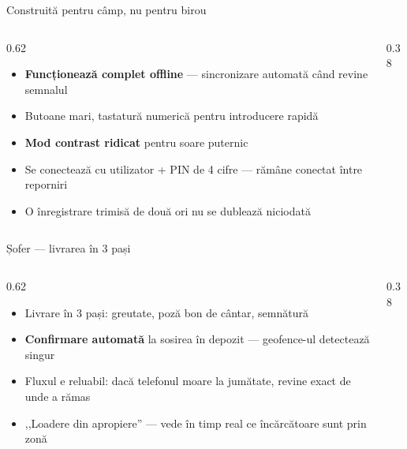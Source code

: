 \documentclass[aspectratio=169,10pt]{beamer}
\begin{document}
\begin{frame}{Construită pentru câmp, nu pentru birou}
  \begin{columns}[T]
    \begin{column}{0.62\linewidth}
      \vspace{0.3cm}
      \begin{itemize}
        \item \textbf{Funcționează complet offline} — sincronizare automată când revine semnalul
        \item Butoane mari, tastatură numerică pentru introducere rapidă
        \item \textbf{Mod contrast ridicat} pentru soare puternic
        \item Se conectează cu utilizator + PIN de 4 cifre — rămâne conectat între reporniri
        \item O înregistrare trimisă de două ori nu se dublează niciodată
      \end{itemize}
    \end{column}
    \begin{column}{0.38\linewidth}
    \end{column}
  \end{columns}
\end{frame}

\begin{frame}{Șofer — livrarea în 3 pași}
  \begin{columns}[T]
    \begin{column}{0.62\linewidth}
      \vspace{0.3cm}
      \begin{itemize}
        \item Livrare în 3 pași: greutate, poză bon de cântar, semnătură
        \item \textbf{Confirmare automată} la sosirea în depozit — geofence-ul detectează singur
        \item Fluxul e reluabil: dacă telefonul moare la jumătate, revine exact de unde a rămas
        \item ,,Loadere din apropiere'' — vede în timp real ce încărcătoare sunt prin zonă
      \end{itemize}
    \end{column}
    \begin{column}{0.38\linewidth}
    \end{column}
  \end{columns}
\end{frame}
\end{document}
